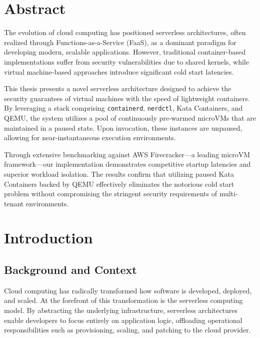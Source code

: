 \documentclass[12pt,a4paper]{report}
\begin{document}
\chapter*{Abstract}
The evolution of cloud computing has positioned serverless architectures, often realized through Functions-as-a-Service (FaaS), as a dominant paradigm for developing modern, scalable applications. However, traditional container-based implementations suffer from security vulnerabilities due to shared kernels, while virtual machine-based approaches introduce significant cold start latencies.

This thesis presents a novel serverless architecture designed to achieve the security guarantees of virtual machines with the speed of lightweight containers. By leveraging a stack comprising \texttt{containerd}, \texttt{nerdctl}, Kata Containers, and QEMU, the system utilizes a pool of continuously pre-warmed microVMs that are maintained in a paused state. Upon invocation, these instances are unpaused, allowing for near-instantaneous execution environments.

Through extensive benchmarking against AWS Firecracker—a leading microVM framework—our implementation demonstrates competitive startup latencies and superior workload isolation. The results confirm that utilizing paused Kata Containers backed by QEMU effectively eliminates the notorious cold start problem without compromising the stringent security requirements of multi-tenant environments.

\newpage

\tableofcontents
\newpage
\listoffigures
\newpage
\listoftables
\newpage


\chapter{Introduction}
\section{Background and Context}
Cloud computing has radically transformed how software is developed, deployed, and scaled. At the forefront of this transformation is the serverless computing model. By abstracting the underlying infrastructure, serverless architectures enable developers to focus entirely on application logic, offloading operational responsibilities such as provisioning, scaling, and patching to the cloud provider.
\end{document}
